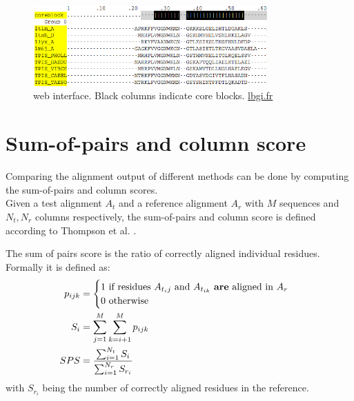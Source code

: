 \begin{figure}[h]
	\centering
	\includegraphics[width=0.8\textwidth]{./images/balibase-web.png}
	\caption{\bb web interface. Black columns indicate core blocks. \href{www.lbgi.fr/wscoperr?Balibase&FileMoi&macsimHtml&BB20006}{lbgi.fr}}
	\label{fig:bb-alignment}
\end{figure}


\section{Sum-of-pairs and column score}
Comparing the alignment output of different methods can be done by computing the sum-of-pairs and column scores.\\
Given a test alignment $A_t$ and a reference alignment $A_r$ with $M$ sequences and $N_t, N_r$ columns respectively, the sum-of-pairs and column score is defined according to Thompson et al. \cite{thompson1999comprehensive}.

\begin{mydef}
	The sum of pairs score is the ratio of correctly aligned individual residues. Formally it is defined as:
	\begin{align*}
	p_{ijk} &= \begin{cases}
	1 \text{ if residues $A_{t{_ij}}$ and $A_{t_{ik}}$ \textbf{are} aligned in $A_r$}\\
	0 \text{ otherwise}
	\end{cases} \\
	S_i &= \sum_{j=1}^{M} \sum_{k=i+1}^{M} p_{ijk} \\
	SPS &= \frac{\sum_{i=1}^{N_t} S_i} {\sum_{i=1}^{N_r} S_{r_i}}
	\end{align*}
	with $S_{r_i}$ being the number of correctly aligned residues in the reference.
\end{mydef}

